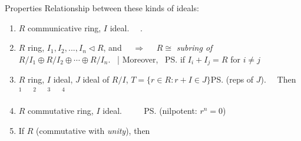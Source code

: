 \documentclass{note}
\begin{document}
\begin{MyTh}{Properties}
    Relationship between these kinds of ideals:
    \begin{enumerate}
        \item $R$ communicative ring, $I$ ideal. \ \ . \qquad {}
        \item {\scriptsize $R$ ring, $I_1,I_2,...,I_n\triangleleft R$, and  \ \ $\Rightarrow$ \ \ $R\cong$ \textit{subring of} $R/I_1\oplus R/I_2\oplus\cdots\oplus R/I_n$. \ | Moreover, \ \ps{\scriptsize {} if $I_i+I_j=R$ for $i\ne j$}}
        \item {\small $R$ ring, $I$ ideal, $J$ ideal of $R/I$, $T=\{r\in R:r+I\in J\}$\ps{(reps of $J$)}. \ \ Then $^1$  \ \ $^2$  \ \ $^3$  \ \ $^4$ }
        \item $R$ commutative ring, $I$ ideal. \ \  \ \ \ps{\tiny (nilpotent: $r^n=0$)}
        \item If $R$ (commutative with \textit{unity}), then  \qquad {}
    \end{enumerate}
\end{MyTh}


%
%
\end{document}
